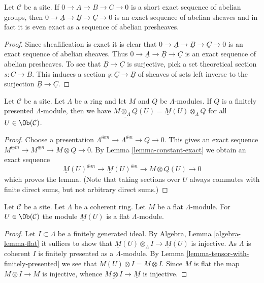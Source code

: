 \begin{lemma}
\label{lemma-constant-exact}
Let $\mathcal{C}$ be a site. If $0 \to A \to B \to C \to 0$
is a short exact sequence of abelian groups, then
$0 \to \underline{A} \to \underline{B} \to \underline{C} \to 0$
is an exact sequence of abelian sheaves and in fact it is even
exact as a sequence of abelian presheaves.
\end{lemma}

\begin{proof}
Since sheafification is exact it is clear that
$0 \to \underline{A} \to \underline{B} \to \underline{C} \to 0$
is an exact sequence of abelian sheaves. Thus
$0 \to \underline{A} \to \underline{B} \to \underline{C}$
is an exact sequence of abelian presheaves. To see that
$\underline{B} \to \underline{C}$ is surjective, pick a
set theoretical section $s : C \to B$. This induces a
section $\underline{s} : \underline{C} \to \underline{B}$
of sheaves of sets left inverse to the surjection
$\underline{B} \to \underline{C}$.
\end{proof}

\begin{lemma}
\label{lemma-tensor-with-finitely-presented}
Let $\mathcal{C}$ be a site. Let $\Lambda$ be a ring and let $M$
and $Q$ be $\Lambda$-modules. If $Q$ is a finitely presented
$\Lambda$-module, then we have
$\underline{M \otimes_\Lambda Q}(U) = \underline{M}(U) \otimes_\Lambda Q$
for all $U \in \Ob(\mathcal{C})$.
\end{lemma}

\begin{proof}
Choose a presentation $\Lambda^{\oplus m} \to \Lambda^{\oplus n} \to Q \to 0$.
This gives an exact sequence
$M^{\oplus m} \to M^{\oplus n} \to M \otimes Q \to 0$.
By Lemma \ref{lemma-constant-exact} we obtain an exact sequence
$$
\underline{M}(U)^{\oplus m} \to
\underline{M}(U)^{\oplus n} \to
\underline{M \otimes Q}(U) \to 0
$$
which proves the lemma. (Note that taking sections over $U$ always
commutes with finite direct sums, but not arbitrary direct sums.)
\end{proof}

\begin{lemma}
\label{lemma-flat-sections}
Let $\mathcal{C}$ be a site. Let $\Lambda$ be a coherent ring.
Let $M$ be a flat $\Lambda$-module. For $U \in \Ob(\mathcal{C})$ the
module $\underline{M}(U)$ is a flat $\Lambda$-module.
\end{lemma}

\begin{proof}
Let $I \subset \Lambda$ be a finitely generated ideal.
By Algebra, Lemma \ref{algebra-lemma-flat} it suffices to show that
$\underline{M}(U) \otimes_\Lambda I \to \underline{M}(U)$
is injective. As $\Lambda$ is coherent $I$ is finitely presented as
a $\Lambda$-module. By Lemma \ref{lemma-tensor-with-finitely-presented}
we see that $\underline{M}(U) \otimes I = \underline{M \otimes I}$.
Since $M$ is flat the map $M \otimes I \to M$ is injective,
whence $\underline{M \otimes I} \to \underline{M}$ is injective.
\end{proof}

